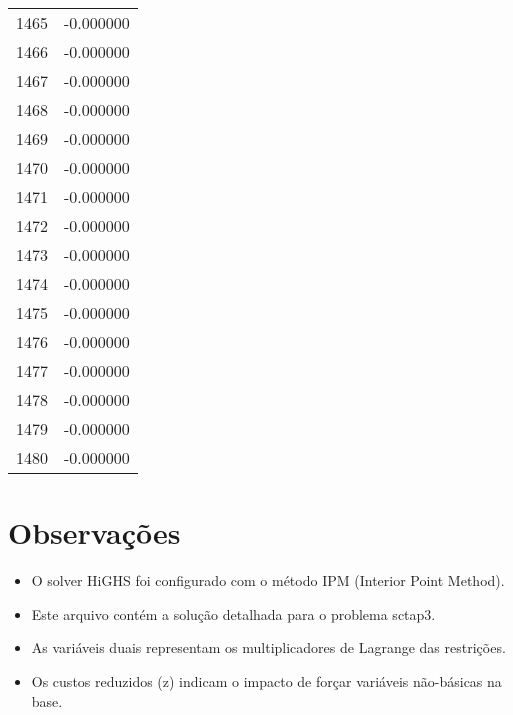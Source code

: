 \documentclass[12pt]{article}
\begin{document}
\begin{longtable}{@{}cc@{}}
1465 & -0.000000 \\
1466 & -0.000000 \\
1467 & -0.000000 \\
1468 & -0.000000 \\
1469 & -0.000000 \\
1470 & -0.000000 \\
1471 & -0.000000 \\
1472 & -0.000000 \\
1473 & -0.000000 \\
1474 & -0.000000 \\
1475 & -0.000000 \\
1476 & -0.000000 \\
1477 & -0.000000 \\
1478 & -0.000000 \\
1479 & -0.000000 \\
1480 & -0.000000 \\

\end{longtable}


\section{Observações}

\begin{itemize}
\item O solver HiGHS foi configurado com o método IPM (Interior Point Method).
\item Este arquivo contém a solução detalhada para o problema sctap3.
\item As variáveis duais representam os multiplicadores de Lagrange das restrições.
\item Os custos reduzidos (z) indicam o impacto de forçar variáveis não-básicas na base.
\end{itemize}
\end{document}

